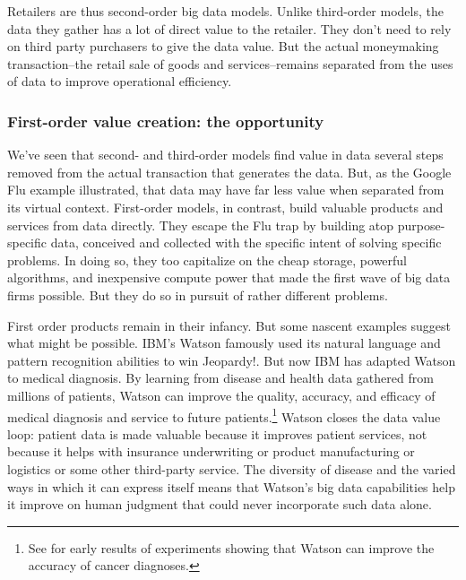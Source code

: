 \documentclass[12pt]{article}
\begin{document}
Retailers are thus second-order big data models. Unlike third-order
models, the data they gather has a lot of direct value to the
retailer. They don't need to rely on third party purchasers to give
the data value. But the actual moneymaking transaction--the retail
sale of goods and services--remains separated from the uses of data to
improve operational efficiency. 



\subsubsection{First-order value creation: the opportunity}
\label{sec:first-order-value}

We've seen that second- and third-order models find value in data
several steps removed from the actual transaction that generates the
data. But, as the Google Flu example illustrated, that data may have
far less value when separated from its virtual context. First-order
models, in contrast, build valuable products and services from data
directly. They escape the Flu trap by building atop purpose-specific
data, conceived and collected with the specific intent of solving
specific problems. In doing so, they too capitalize on the cheap storage,
powerful algorithms, and inexpensive compute power that made the first
wave of big data firms possible. But they do so in pursuit of rather
different problems.

First order products remain in their infancy. But some nascent
examples suggest what might be possible. IBM's Watson famously used
its natural language and pattern recognition abilities to win
Jeopardy!. But now IBM has adapted Watson to medical diagnosis. By
learning from disease and health data gathered from millions of
patients, Watson can improve the quality, accuracy, and efficacy of
medical diagnosis and service to future patients.\footnote{See
\cite{wired2013a} for early results of experiments showing that Watson
can improve the accuracy of cancer diagnoses.} Watson closes the data
value loop: patient data is made valuable because it improves patient
services, not because it helps with insurance underwriting or product
manufacturing or logistics or some other third-party service. The
diversity of disease and the varied ways in which it can express
itself means that Watson's big data capabilities help it improve on
human judgment that could never incorporate such data alone.
\end{document}
